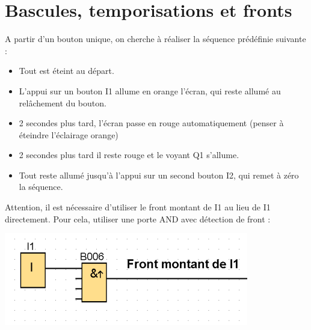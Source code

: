\documentclass[11pt]{article}
\begin{document}
\section{Bascules, temporisations et fronts}

A partir d’un bouton unique, on cherche à réaliser la séquence prédéfinie suivante :


\begin{itemize}
    \item Tout est éteint au départ.
    \item L’appui sur un bouton I1 allume en orange l’écran, qui reste allumé au relâchement du
    bouton.
    \item 2 secondes plus tard, l’écran passe en rouge automatiquement (penser à éteindre l'éclairage orange)
    \item 2 secondes plus tard il reste rouge et le voyant Q1 s’allume.
    \item Tout reste allumé jusqu’à l’appui sur un second bouton I2, qui remet à zéro la séquence.    
\end{itemize}

\begin{UPSTIactivite}

    \begin{minipage}{.6\textwidth}
        Attention, il est nécessaire d'utiliser le front montant de I1 au lieu de I1 directement. Pour cela, utiliser une porte AND avec détection de front : 
    \end{minipage}
    \begin{minipage}{.3\textwidth}
        \includegraphics[width=\textwidth]{images/activite-frontAnd.png}
    \end{minipage}

    
\end{UPSTIactivite}
\end{document}
